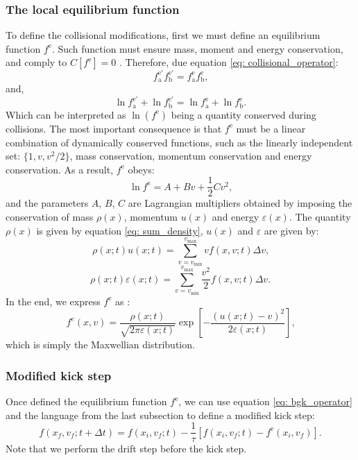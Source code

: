 \documentclass[fleqn,usenatbib]{mnras}
\begin{document}
\subsubsection{The local equilibrium function}
To define the collisional modifications, first we must define an equilibrium function $f^\text{e}$. Such function must ensure mass, moment and energy conservation, and comply to $C[f^\text{e}] = 0$ \citep{book:460703}. Therefore, due equation \ref{eq: collisional_operator}:
\begin{equation}
f_\text{a}^{\text{e}\prime}  f_\text{b}^{\text{e}\prime} = f_\text{a}^\text{e} f_\text{b}^\text{e} \text{,}
\end{equation}
and,
\begin{equation}
\ln f_\text{a}^{\text{e}\prime} + \ln f_\text{b}^{\text{e}\prime} = \ln f_\text{a}^\text{e} + \ln f_\text{b}^\text{e} \text{.}
\end{equation}
Which can be interpreted as $\ln(f^\text{e})$ being a quantity conserved during collisions. The most important consequence is that $f^\text{e}$ must be a linear combination of dynamically conserved functions, such as the linearly independent set: $\{1,v, v^2/2\}$, mass conservation, momentum conservation and energy conservation. As a result, $f^\text{e}$ obeys:
\begin{equation}
\ln f^{\text{e}} = A + B v + \frac{1}{2} C v^2\text{,}
\end{equation}
and the parameters $A$, $B$, $C$ are Lagrangian multipliers obtained by imposing the conservation of mass $\rho(x)$, momentum $u(x)$ and energy $\varepsilon (x)$. The quantity $\rho(x)$ is given by equation \ref{eq: sum_density}, $u(x)$ and $\varepsilon$ are given by:
\begin{equation}
\rho (x;t) u(x;t)= \sum\limits_{v= v_{\text{min}}}^{v_{\text{max}}} v f(x,v;t) \Delta v\text{,}
\end{equation}
\begin{equation}
\rho (x;t) \varepsilon(x;t)= \sum\limits_{v= v_{\text{min}}}^{v_{\text{max}}} \frac{v^2}{2} f(x,v;t) \Delta v\text{.}
\end{equation}
In the end, we express $f^\text{e}$ as \citep{asinari}:
\begin{equation}
f^e(x,v) = \frac{\rho(x;t)}{\sqrt{2 \pi \varepsilon(x;t)}} \exp[-\frac{(u(x;t)-v)^2}{2\varepsilon (x;t)}]\text{,}
\end{equation}
which is simply the Maxwellian distribution.
\subsubsection{Modified kick step}
Once defined the equilibrium function $f^\text{e}$, we can use equation \ref{eq: bgk_operator} and the language from the last subsection to define a modified kick step:
\begin{equation}
f(x_f,v_f;t+\Delta t) = f(x_i,v_f;t) - \frac{1}{\tau}\left[f(x_i,v_f;t)-f^\text{e} (x_i,v_f)\right]\text{.}
\end{equation}
Note that we perform the drift step before the kick step.
\end{document}
